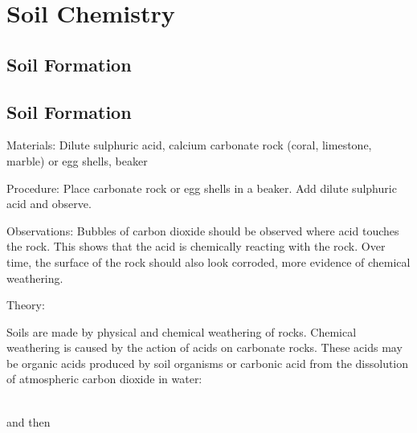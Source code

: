 \section{Soil Chemistry}  

\begin{multicols}{2}


\section*{Soil Formation}


\subsection{Soil Formation}


\begin{description*}
\item[Materials:]{Dilute sulphuric acid, calcium carbonate rock (coral, limestone, marble) or egg shells, beaker}
\item[Procedure:]{Place carbonate rock or egg shells in a beaker. Add dilute sulphuric acid and observe.}
\item[Observations:]{Bubbles of carbon dioxide should be observed where acid touches the rock. This shows that the acid is chemically reacting with the rock. Over time, the surface of the rock should also look corroded, more evidence of chemical weathering.}
\item[Theory:]{
\raggedright Soils are made by physical and chemical weathering of rocks. Chemical weathering is caused by the action of acids on carbonate rocks. These acids may be organic acids produced by soil organisms or carbonic acid from the dissolution of atmospheric carbon dioxide in water:\\

\centering
{}\\
\raggedright

and then\\

\\
\raggedright

}
\end{description*}
\end{multicols}
